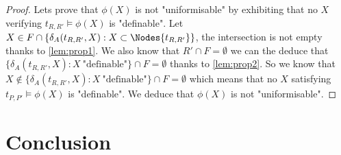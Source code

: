 \documentclass[a4paper,UKenglish,cleveref, autoref, thm-restate]{lipics-v2021}
\begin{document}
\begin{proof}
	Lets prove that  $\phi(X)$ is not "uniformisable" by exhibiting that no $X$ verifying $t_{R,R'} \models \phi(X)$ is "definable".
	Let $X \in F \cap \{ \delta_A (t_{R,R'},X) : X \subset \Nodes {t_{R,R'}}\}$, the intersection is not empty thanks to \ref{lem:prop1}. 
	We also know that $R' \cap F = \emptyset$ we can the deduce that $\{ \delta_A (t_{R,R'},X) : X \ \text{"definable"}\} \cap F = \emptyset$
	thanks to \ref{lem:prop2}. So we know that $X \notin \{ \delta_A (t_{R,R'},X) : X \ \text{"definable"}\} \cap F = \emptyset$ which means that no
	$X$ satisfying $t_{P,P'} \models \phi(X)$ is "definable". We deduce that $\phi(X)$ is not "uniformisable".
\end{proof}

\section{Conclusion}



\end{document}
